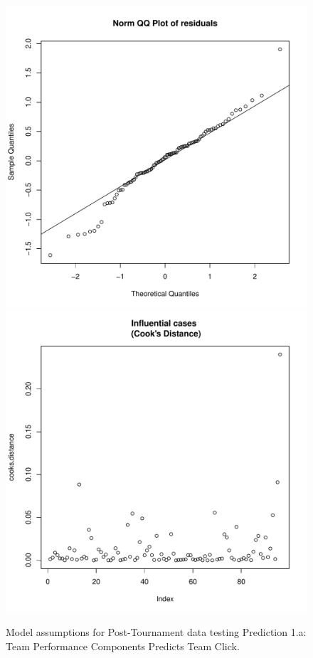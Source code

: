 \begin{CJK}{UTF8}{gbsn}
\begin{figure}[htbp]
     \includegraphics[scale =.4]{images/MLM1aQQPlot.pdf}
     \includegraphics[scale =.4]{images/MLM1aCooksD.pdf}
     \caption{Model assumptions for Post-Tournament data testing Prediction 1.a: Team Performance Components Predicts Team Click.}
     \label{fig:MLM1aAssumptions}
 \end{figure}




\end{CJK}
